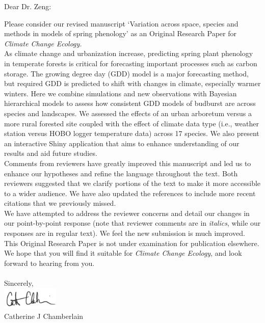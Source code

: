 \documentclass[11pt,a4paper]{letter}\usepackage[]{graphicx}\usepackage[]{color}
\begin{document}
\begin{letter}{}

\opening{Dear Dr. Zeng:}

\noindent Please consider our revised manuscript `Variation across space, species and methods in models of spring phenology' as an Original Research Paper for \emph{Climate Change Ecology.} 
\vspace{1.5ex}\\
As climate change and urbanization increase, predicting spring plant phenology in temperate forests is critical for forecasting important processes such as carbon storage. The growing degree day (GDD) model is a major forecasting method, but required GDD is predicted to shift with changes in climate, especially warmer winters. Here we combine simulations and new observations with Bayesian hierarchical models to assess how consistent GDD models of budburst are across species and landscapes. We assessed the effects of an urban arboretum versus a more rural forested site coupled with the effect of climate data type (i.e., weather station versus HOBO logger temperature data) across 17 species. We also present an interactive Shiny application that aims to enhance understanding of our results and aid future studies.
\vspace{1.5ex}\\ 
Comments from reviewers have greatly improved this manuscript and led us to enhance our hypotheses and refine the language throughout the text. Both reviewers suggested that we clarify portions of the text to make it more accessible to a wider audience. We have also updated the references to include more recent citations that we previously missed. 
\vspace{1.5ex}\\
We have attempted to address the reviewer concerns and detail our changes in our point-by-point response (note that reviewer comments are in \emph{italics}, while our responses are in regular text). We feel the new submission is much improved. This Original Research Paper is not under examination for publication elsewhere. We hope that you will find it suitable for \emph{Climate Change Ecology}, and look forward to hearing from you.
\\\vspace{-1ex}\\
\noindent Sincerely,\\

 \includegraphics[width=0.2\textwidth]{Full_Signature.jpg} \\
 

\noindent Catherine J Chamberlain


\end{letter}
\end{document}
